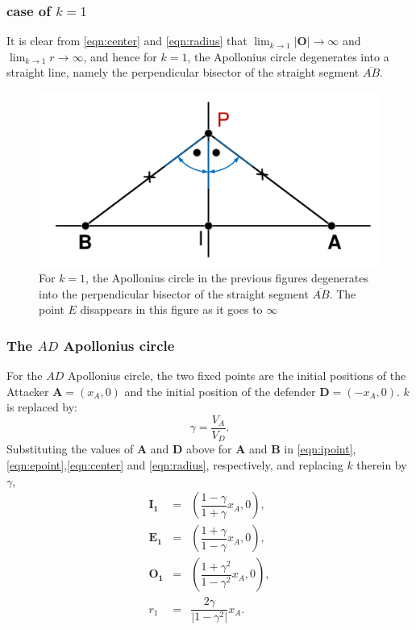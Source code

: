 \documentclass{beamer}
\begin{document}
\begin{frame}
\frametitle{case of $k=1$}
It is clear from \eqref{eqn:center} and \eqref{eqn:radius} that $\lim_{k\to1}\lvert\boldsymbol{O}\rvert\to\infty$ and $\lim_{k\to1}r\to\infty$, and hence for $k=1$, the Apollonius circle degenerates into a straight line, namely the perpendicular bisector of the straight segment $\overline{AB}$.

\begin{figure}[htb]
\centering
\includegraphics[scale = 0.3]{fig/drawing3.pdf}
\caption{For $k=1$, the Apollonius circle in the previous figures degenerates into the perpendicular bisector of the straight segment $\overline{AB}$. The point $E$ disappears in this figure as it goes to $\infty$  }
\label{3}
\end{figure}
\end{frame}
\begin{frame} 
\frametitle{The $AD$ Apollonius circle}
For the $AD$ Apollonius circle, the two fixed points are the initial positions of the Attacker $\boldsymbol{A}=(x_{A},0)$ and the initial position of the defender $\boldsymbol{D}=(-x_{A},0)$.  $k$ is replaced by: 
\begin{equation}
\gamma = \dfrac{V_{A}}{V_{D}}.
\end{equation}
Substituting the values of $\boldsymbol{A}$ and $\boldsymbol{D}$ above for $\boldsymbol{A}$ and $\boldsymbol{B}$ in \eqref{eqn:ipoint},\eqref{eqn:epoint},\eqref{eqn:center} and \eqref{eqn:radius}, respectively, and replacing $k$ therein by $\gamma$,
\begin{eqnarray}
\boldsymbol{I_{1}} &=& (\dfrac{1-\gamma}{1+\gamma}x_{A},0),\\
\boldsymbol{E_{1}} &=& (\dfrac{1+\gamma}{1-\gamma}x_{A},0),\\
\boldsymbol{O_{1}} &=& (\dfrac{1+\gamma^{2}}{1-\gamma^{2}}x_{A},0),\\
\label{O1}
r_{1} &=& \dfrac{2\gamma}{\lvert1-\gamma^{2}\rvert}x_{A}.
\label{r1}
\end{eqnarray}
\end{frame}
\end{document}
